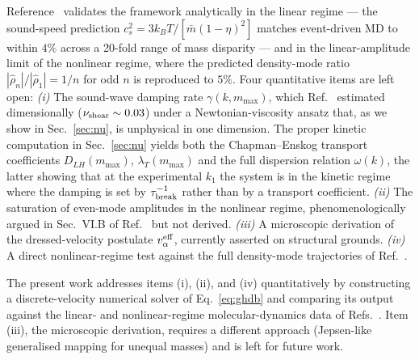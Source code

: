 \documentclass[aps,pre,twocolumn,superscriptaddress,longbibliography,floatfix]{revtex4-2}
\begin{document}
Reference~\cite{PaperIV} validates the framework analytically
in the linear regime --- the sound-speed prediction
$c_s^2 = 3k_BT/[\bar m(1-\eta)^2]$ matches event-driven MD to
within $4\%$ across a 20-fold range of mass disparity --- and
in the linear-amplitude limit of the nonlinear regime, where
the predicted density-mode ratio $|\hat\rho_n|/|\hat\rho_1|
=1/n$ for odd $n$ is reproduced to $5\%$. Four quantitative
items are left open:
\emph{(i)} The sound-wave damping rate $\gamma(k,m_{\max})$,
which Ref.~\cite{PaperIV} estimated dimensionally
($\nu_{\rm shear}\sim 0.03$) under a Newtonian-viscosity
ansatz that, as we show in Sec.~\ref{sec:nu}, is unphysical
in one dimension. The proper kinetic computation in
Sec.~\ref{sec:nu} yields both the Chapman--Enskog transport
coefficients $D_{LH}(m_{\max})$, $\lambda_T(m_{\max})$ and
the full dispersion relation $\omega(k)$, the latter showing
that at the experimental $k_1$ the system is in the
kinetic regime where the damping is set by
$\tau_{\rm break}^{-1}$ rather than by a transport
coefficient.
\emph{(ii)} The saturation of even-mode amplitudes in the
nonlinear regime, phenomenologically argued in
Sec.~VI.B of Ref.~\cite{PaperIV} but not derived.
\emph{(iii)} A microscopic derivation of the dressed-velocity
postulate $v^{\rm eff}_\alpha$, currently asserted on
structural grounds.
\emph{(iv)} A direct nonlinear-regime test against the full
density-mode trajectories of Ref.~\cite{PaperIII}.

The present work addresses items (i), (ii), and (iv)
quantitatively by constructing a discrete-velocity numerical
solver of Eq.~\eqref{eq:ghdb} and comparing its output against
the linear- and nonlinear-regime molecular-dynamics data of
Refs.~\cite{PaperII,PaperIII}. Item (iii), the microscopic
derivation, requires a different approach (Jepsen-like
generalised mapping for unequal masses) and is left for
future work.
\end{document}
